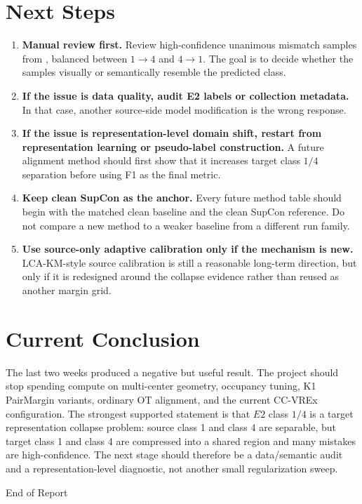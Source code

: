 \documentclass[11pt]{article}
\begin{document}
\section{Next Steps}

\begin{enumerate}[leftmargin=*]
    \item \textbf{Manual review first.} Review high-confidence unanimous mismatch samples from , balanced between $1\rightarrow4$ and $4\rightarrow1$. The goal is to decide whether the samples visually or semantically resemble the predicted class.

    \item \textbf{If the issue is data quality, audit E2 labels or collection metadata.} In that case, another source-side model modification is the wrong response.

    \item \textbf{If the issue is representation-level domain shift, restart from representation learning or pseudo-label construction.} A future alignment method should first show that it increases target class $1/4$ separation before using F1 as the final metric.

    \item \textbf{Keep clean SupCon as the anchor.} Every future method table should begin with the matched clean baseline and the clean SupCon reference. Do not compare a new method to a weaker baseline from a different run family.

    \item \textbf{Use source-only adaptive calibration only if the mechanism is new.} LCA-KM-style source calibration is still a reasonable long-term direction, but only if it is redesigned around the collapse evidence rather than reused as another margin grid.
\end{enumerate}

\section{Current Conclusion}

The last two weeks produced a negative but useful result. The project should stop spending compute on multi-center geometry, occupancy tuning, K1 PairMargin variants, ordinary OT alignment, and the current CC-VREx configuration. The strongest supported statement is that $E2$ class $1/4$ is a target representation collapse problem: source class 1 and class 4 are separable, but target class 1 and class 4 are compressed into a shared region and many mistakes are high-confidence. The next stage should therefore be a data/semantic audit and a representation-level diagnostic, not another small regularization sweep.

\vfill
\begin{center}
End of Report
\end{center}
\end{document}
